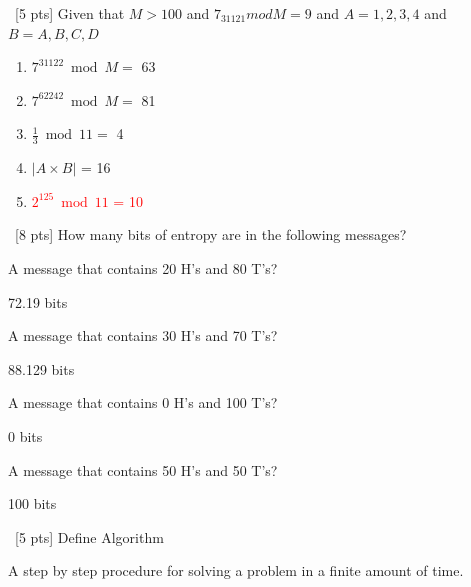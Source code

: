 \documentclass[12pt]{article}
\newenvironment{sol}[1][Solution]{\begin{trivlist}\item[\hskip\labelsep {\bfseries #1:}]}{\end{trivlist}}
\begin{document}
\begin{enumerate}
    \item \ [5 pts] Given that $M > 100$ and $7_{31121} mod M = 9$ and $A = {1, 2, 3, 4}$ and $B = {A, B, C, D}$
    \begin{enumerate}
        \item $7^{31122} \bmod M = $  63
        \item $7^{62242} \bmod M = $ 81
        \item $\frac{1}{3} \bmod 11 = $ 4
        \item $|A\times B|$ = 16
        \item \textcolor{red}{$2^{125} \bmod 11$ = 10}
    \end{enumerate}

    \item \ [8 pts] How many bits of entropy are in the following messages?
        \begin{enumerate}
            \item A message that contains 20 H’s and 80 T’s?
            \begin{sol}
            72.19 bits
            \end{sol}

            \item A message that contains 30 H’s and 70 T’s?
            \begin{sol}
            88.129 bits
            \end{sol}

            \item A message that contains 0 H’s and 100 T’s?
            \begin{sol}
            0 bits
            \end{sol}

            \item A message that contains 50 H’s and 50 T’s?
            \begin{sol}
            100 bits
            \end{sol}

        \end{enumerate}

    \item \ [5 pts] Define Algorithm
    \begin{sol}
    A step by step procedure for solving a problem in a finite amount of time.
    \end{sol}


\end{enumerate}
\end{document}
